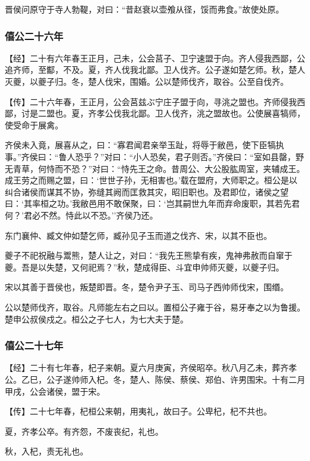 \documentclass[]{article}
\begin{document}
晋侯问原守于寺人勃鞮，对曰：``昔赵衰以壶飧从径，馁而弗食。''故使处原。

\hypertarget{header-n941}{%
\subsubsection{僖公二十六年}\label{header-n941}}

【经】二十有六年春王正月，己未，公会莒子、卫宁速盟于向。齐人侵我西鄙，公追齐师，至酅，不及。夏，齐人伐我北鄙。卫人伐齐。公子遂如楚乞师。秋，楚人灭夔，以夔子归。冬，楚人伐宋，围婚。公以楚师伐齐，取谷。公至自伐齐。

【传】二十六年春，王正月，公会莒兹ぶ宁庄子盟于向，寻洮之盟也。齐师侵我西鄙，讨是二盟也。夏，齐孝公伐我北鄙。卫人伐齐，洮之盟故也。公使展喜犒师，使受命于展禽。

齐侯未入竟，展喜从之，曰：``寡君闻君亲举玉趾，将辱于敝邑，使下臣犒执事。''齐侯曰：``鲁人恐乎？''对曰：``小人恐矣，君子则否。''齐侯曰：``室如县罄，野无青草，何恃而不恐？''对曰：``恃先王之命。昔周公、大公股肱周室，夹辅成王。成王劳之而赐之盟，曰：`世世子孙，无相害也。'载在盟府，大师职之。桓公是以纠合诸侯而谋其不协，弥缝其阙而匡救其灾，昭旧职也。及君即位，诸侯之望曰：`其率桓之功。'我敝邑用不敢保聚，曰：`岂其嗣世九年而弃命废职，其若先君何？'君必不然。恃此以不恐。''齐侯乃还。

东门襄仲、臧文仲如楚乞师，臧孙见子玉而道之伐齐、宋，以其不臣也。

夔子不祀祝融与鬻熊，楚人让之，对曰：``我先王熊挚有疾，鬼神弗赦而自窜于夔。吾是以失楚，又何祀焉？''秋，楚成得臣、斗宜申帅师灭夔，以夔子归。

宋以其善于晋侯也，叛楚即晋。冬，楚令尹子玉、司马子西帅师伐宋，围缗。

公以楚师伐齐，取谷。凡师能左右之曰以。置桓公子雍于谷，易牙奉之以为鲁援。楚申公叔侯戍之。桓公之子七人，为七大夫于楚。

\hypertarget{header-n951}{%
\subsubsection{僖公二十七年}\label{header-n951}}

【经】二十有七年春，杞子来朝。夏六月庚寅，齐侯昭卒。秋八月乙未，葬齐孝公。乙巳，公子遂帅师入杞。冬，楚人、陈侯、蔡侯、郑伯、许男围宋。十有二月甲戌，公会诸侯，盟于宋。

【传】二十七年春，杞桓公来朝，用夷礼，故曰子。公卑杞，杞不共也。

夏，齐孝公卒。有齐怨，不废丧纪，礼也。

秋，入杞，责无礼也。
\end{document}
